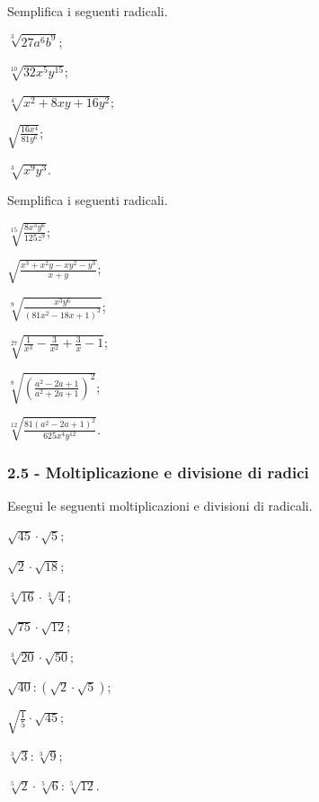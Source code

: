 \begin{esercizio}[\Ast]
 \label{ese:2.33}
Semplifica i seguenti radicali.
 \begin{multicols}{3}
 \begin{enumeratea}
 \item $\sqrt[3]{27 a^6 b^9}$;
 \item $\sqrt[10]{32 x^5 y^{15}}$;
 \item $\sqrt[4]{x^2 +8xy+16y^2}$;
 \item $\sqrt{\frac{16 x^4}{81 y^6}}$;
 \item $\sqrt[3]{x^9 y^3}$.
 \end{enumeratea}
 \end{multicols}
\end{esercizio}
\pagebreak
\begin{esercizio}[\Ast]
 \label{ese:2.34}
Semplifica i seguenti radicali.
 \begin{multicols}{2}
 \begin{enumeratea}
 \item $\sqrt[15]{\frac{8x^3 y^6}{125z^9}}$;
 \item $\sqrt{\frac{x^3+x^2 y-xy^2 -y^3}{x+y}}$;
 \item $\sqrt[9]{\frac{x^3 y^6}{(81x^2-18x+1)^3}}$;
 \item $\sqrt[27]{\frac{1}{x^3}-\frac{3}{x^2}+\frac{3}{x}-1}$;
 \item $\sqrt[8]{\left(\frac{a^2-2a+1}{a^2+2a+1}\right)^2}$;
 \item $\sqrt[12]{\frac{81(a^2-2a+1)^2}{625 x^4 y^{12}}}$.
 \end{enumeratea}
 \end{multicols}
\end{esercizio}

\subsubsection*{2.5 - Moltiplicazione e divisione di radici}
\begin{esercizio}[\Ast]
 \label{ese:2.35}
Esegui le seguenti moltiplicazioni e divisioni di radicali.
 \begin{multicols}{3}
 \begin{enumeratea}
 \item $\sqrt{45}\cdot \sqrt 5$;
 \item $\sqrt 2\cdot \sqrt{18}$;
 \item $\sqrt[3]{16}\cdot \sqrt[3]4$;
 \item $\sqrt{75}\cdot \sqrt{12}$;
 \item $\sqrt[3]{20}\cdot \sqrt{50}$;
 \item $\sqrt{40}:\left(\sqrt 2\cdot \sqrt 5\right)$;
 \item $\sqrt{\frac 1 5}\cdot \sqrt{45}$;
 \item $\sqrt[3]3:\sqrt[3]9$;
 \item $\sqrt[5]2\cdot \sqrt[5]6:\sqrt[5]{12}$.
 \end{enumeratea}
 \end{multicols}
\end{esercizio}

